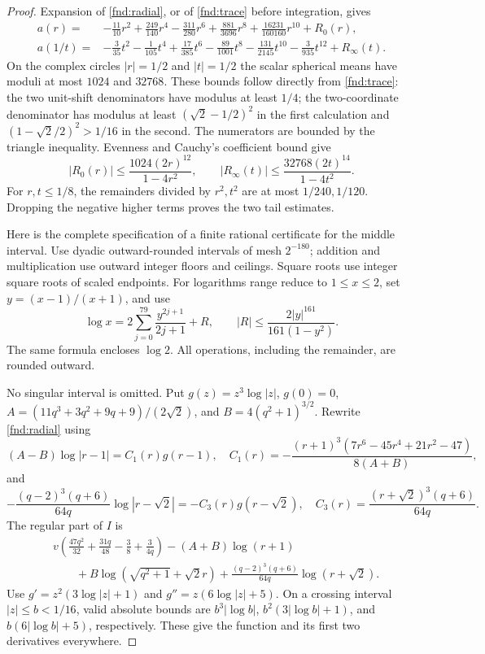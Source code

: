 \documentclass[11pt,a4paper]{amsart}
\theoremstyle{definition}
\theoremstyle{remark}
\numberwithin{equation}{section}
\begin{document}
\begin{proof}
Expansion of \eqref{fnd:radial}, or of \eqref{fnd:trace} before integration,
gives
\begin{align*}
 a(r)={}&-\frac{11}{10}r^2+\frac{249}{140}r^4-\frac{311}{280}r^6
       +\frac{881}{3696}r^8+\frac{16231}{160160}r^{10}+R_0(r),\\
 a(1/t)={}&-\frac3{35}t^2-\frac1{105}t^4+\frac{17}{385}t^6
       -\frac{89}{1001}t^8-\frac{131}{2145}t^{10}
       -\frac3{935}t^{12}+R_\infty(t).
\end{align*}
On the complex circles $|r|=1/2$ and $|t|=1/2$ the scalar spherical means have
moduli at most $1024$ and $32768$. These bounds follow directly from
\eqref{fnd:trace}: the two unit-shift denominators have modulus at least $1/4$;
the two-coordinate denominator has modulus at least $(\sqrt2-1/2)^2$ in the
first calculation and $(1-\sqrt2/2)^2>1/16$ in the second. The numerators are
bounded by the triangle inequality. Evenness and Cauchy's coefficient bound
give
\[
 |R_0(r)|\le\frac{1024(2r)^{12}}{1-4r^2},\qquad
 |R_\infty(t)|\le\frac{32768(2t)^{14}}{1-4t^2}.
\]
For $r,t\le1/8$, the remainders divided by $r^2,t^2$ are at most $1/240,1/120$.
Dropping the negative higher terms proves the two tail estimates.

Here is the complete specification of a finite rational certificate for the
middle interval. Use dyadic outward-rounded intervals of mesh $2^{-180}$;
addition and multiplication use outward integer floors and ceilings. Square
roots use integer square roots of scaled endpoints. For logarithms range
reduce to $1\le x\le2$, set $y=(x-1)/(x+1)$, and use
\[
 \log x=2\sum_{j=0}^{79}\frac{y^{2j+1}}{2j+1}+R,
 \qquad |R|\le\frac{2|y|^{161}}{161(1-y^2)}.
\]
The same formula encloses $\log2$. All operations, including the remainder,
are rounded outward.

No singular interval is omitted. Put $g(z)=z^3\log|z|$, $g(0)=0$,
$A=(11q^3+3q^2+9q+9)/(2\sqrt2)$, and $B=4(q^2+1)^{3/2}$. Rewrite
\eqref{fnd:radial} using
\[
 (A-B)\log|r-1|=C_1(r)g(r-1),\quad
 C_1(r)=-\frac{(r+1)^3(7r^6-45r^4+21r^2-47)}{8(A+B)},
\]
and
\[
 -\frac{(q-2)^3(q+6)}{64q}\log|r-\sqrt2|
 =-C_3(r)g(r-\sqrt2),\quad
 C_3(r)=\frac{(r+\sqrt2)^3(q+6)}{64q}.
\]
The regular part of $I$ is
\begin{align*}
 &v\left(\frac{47q^2}{32}+\frac{31q}{48}-\frac38+\frac3{4q}\right)
 -(A+B)\log(r+1)\\
 &\qquad+B\log(\sqrt{q^2+1}+\sqrt2r)
 +\frac{(q-2)^3(q+6)}{64q}\log(r+\sqrt2).
\end{align*}
Use $g'=z^2(3\log|z|+1)$ and $g''=z(6\log|z|+5)$. On a crossing interval
$|z|\le b<1/16$, valid absolute bounds are $b^3|\log b|$,
$b^2(3|\log b|+1)$, and $b(6|\log b|+5)$, respectively. These give the
function and its first two derivatives everywhere.


\end{proof}
\end{document}

